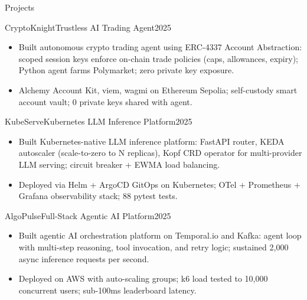 \documentclass[]{mcdowellcv}
\begin{document}
\begin{cvsection}{Projects}
  \begin{cvsubsection}{CryptoKnight}{Trustless AI Trading Agent}{2025}
    \begin{itemize}
      \item Built autonomous crypto trading agent using ERC-4337 Account Abstraction: scoped session keys enforce on-chain trade policies (caps, allowances, expiry); Python agent farms Polymarket; zero private key exposure.
      \item Alchemy Account Kit, viem, wagmi on Ethereum Sepolia; self-custody smart account vault; 0 private keys shared with agent.
    \end{itemize}
    \vspace{-1.5pt}
  \end{cvsubsection}

  \begin{cvsubsection}{KubeServe}{Kubernetes LLM Inference Platform}{2025}
    \begin{itemize}
      \item Built Kubernetes-native LLM inference platform: FastAPI router, KEDA autoscaler (scale-to-zero to N replicas), Kopf CRD operator for multi-provider LLM serving; circuit breaker + EWMA load balancing.
      \item Deployed via Helm + ArgoCD GitOps on Kubernetes; OTel + Prometheus + Grafana observability stack; 88 pytest tests.
    \end{itemize}
    \vspace{-1.5pt}
  \end{cvsubsection}

  \begin{cvsubsection}{AlgoPulse}{Full-Stack Agentic AI Platform}{2025}
    \begin{itemize}
      \item Built agentic AI orchestration platform on Temporal.io and Kafka: agent loop with multi-step reasoning, tool invocation, and retry logic; sustained 2,000 async inference requests per second.
      \item Deployed on AWS with auto-scaling groups; k6 load tested to 10,000 concurrent users; sub-100ms leaderboard latency.
    \end{itemize}
    \vspace{-1.5pt}
  \end{cvsubsection}
\end{cvsection}
\end{document}
